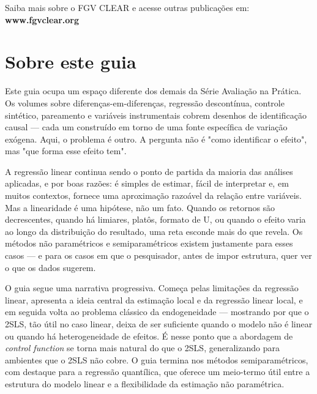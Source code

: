 \documentclass[12pt, a4paper, openany]{book}
\begin{document}
\noindent Saiba mais sobre o FGV CLEAR e acesse outras publicações em:
\textbf{www.fgvclear.org}

\vfill

\newpage

\thispagestyle{empty}
\chapter*{Sobre este guia}

Este guia ocupa um espaço diferente dos demais da Série Avaliação na Prática.
Os volumes sobre diferenças-em-diferenças, regressão descontínua, controle
sintético, pareamento e variáveis instrumentais cobrem desenhos de identificação
causal --- cada um construído em torno de uma fonte específica de variação exógena.
Aqui, o problema é outro. A pergunta não é "como identificar o efeito", mas
"que forma esse efeito tem".

A regressão linear continua sendo o ponto de partida da maioria das análises
aplicadas, e por boas razões: é simples de estimar, fácil de interpretar e, em
muitos contextos, fornece uma aproximação razoável da relação entre variáveis.
Mas a linearidade é uma hipótese, não um fato. Quando os retornos são
decrescentes, quando há limiares, platôs, formato de U, ou quando o efeito
varia ao longo da distribuição do resultado, uma reta esconde mais do que
revela. Os métodos não paramétricos e semiparamétricos existem justamente para
esses casos --- e para os casos em que o pesquisador, antes de impor estrutura,
quer ver o que os dados sugerem.

O guia segue uma narrativa progressiva. Começa pelas limitações da regressão
linear, apresenta a ideia central da estimação local e da regressão linear
local, e em seguida volta ao problema clássico da endogeneidade --- mostrando
por que o 2SLS, tão útil no caso linear, deixa de ser suficiente quando o
modelo não é linear ou quando há heterogeneidade de efeitos. É nesse ponto
que a abordagem de \emph{control function} se torna mais natural do que o
2SLS, generalizando para ambientes que o 2SLS não cobre. O guia termina nos
métodos semiparamétricos, com destaque para a regressão quantílica, que
oferece um meio-termo útil entre a estrutura do modelo linear e a flexibilidade
da estimação não paramétrica.
\end{document}
